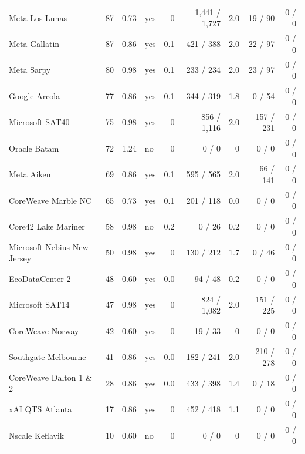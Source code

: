 {\begin{longtable}{@{}lrrlrrrrr@{}}
Meta Los Lunas & 87 & 0.73 & yes & 0 & 1,441 / 1,727 & 2.0 & 19 / 90 & 0 / 0 \\
Meta Gallatin & 87 & 0.86 & yes & 0.1 & 421 / 388 & 2.0 & 22 / 97 & 0 / 0 \\
Meta Sarpy & 80 & 0.98 & yes & 0.1 & 233 / 234 & 2.0 & 23 / 97 & 0 / 0 \\
Google Arcola & 77 & 0.86 & yes & 0.1 & 344 / 319 & 1.8 & 0 / 54 & 0 / 0 \\
Microsoft SAT40 & 75 & 0.98 & yes & 0 & 856 / 1,116 & 2.0 & 157 / 231 & 0 / 0 \\
Oracle Batam & 72 & 1.24 & no & 0 & 0 / 0 & 0 & 0 / 0 & 0 / 0 \\
Meta Aiken & 69 & 0.86 & yes & 0.1 & 595 / 565 & 2.0 & 66 / 141 & 0 / 0 \\
CoreWeave Marble NC & 65 & 0.73 & yes & 0.1 & 201 / 118 & 0.0 & 0 / 0 & 0 / 0 \\
Core42 Lake Mariner & 58 & 0.98 & no & 0.2 & 0 / 26 & 0.2 & 0 / 0 & 0 / 0 \\
Microsoft-Nebius New Jersey & 50 & 0.98 & yes & 0 & 130 / 212 & 1.7 & 0 / 46 & 0 / 0 \\
EcoDataCenter 2 & 48 & 0.60 & yes & 0.0 & 94 / 48 & 0.2 & 0 / 0 & 0 / 0 \\
Microsoft SAT14 & 47 & 0.98 & yes & 0 & 824 / 1,082 & 2.0 & 151 / 225 & 0 / 0 \\
CoreWeave Norway & 42 & 0.60 & yes & 0 & 19 / 33 & 0 & 0 / 0 & 0 / 0 \\
Southgate Melbourne & 41 & 0.86 & yes & 0.0 & 182 / 241 & 2.0 & 210 / 278 & 0 / 0 \\
CoreWeave Dalton 1 \& 2 & 28 & 0.86 & yes & 0.0 & 433 / 398 & 1.4 & 0 / 18 & 0 / 0 \\
xAI QTS Atlanta & 17 & 0.86 & yes & 0 & 452 / 418 & 1.1 & 0 / 0 & 0 / 0 \\
Nscale Keflavik & 10 & 0.60 & no & 0 & 0 / 0 & 0 & 0 / 0 & 0 / 0 \\
\end{longtable}}
